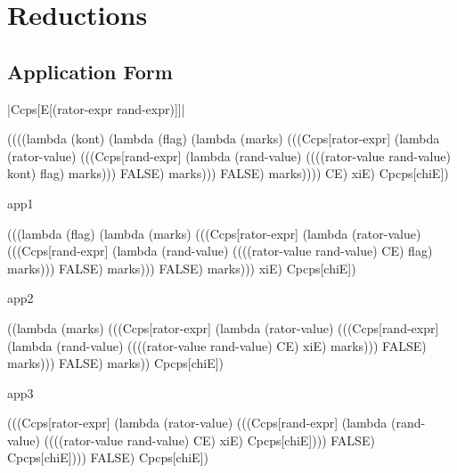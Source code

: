 \chapter{Reductions}

\section{Application Form}

\noindent
\scheme|Ccps[E[(rator-expr rand-expr)]]|
\begin{schemeblock}
\begin{schemedisplay}
((((lambda (kont)
     (lambda (flag)
       (lambda (marks)
         (((Ccps[rator-expr]
                (lambda (rator-value)
                  (((Ccps[rand-expr]
                         (lambda (rand-value)
                           ((((rator-value rand-value) kont) flag) marks)))
                    FALSE) marks)))
           FALSE) marks))))
   CE) xiE) Cpcps[chiE])
\end{schemedisplay}
\end{schemeblock}

\noindent
app1

\begin{schemeblock}
\begin{schemedisplay}
(((lambda (flag)
    (lambda (marks)
      (((Ccps[rator-expr]
             (lambda (rator-value)
               (((Ccps[rand-expr]
                      (lambda (rand-value)
                        ((((rator-value rand-value) CE) flag) marks)))
                 FALSE) marks)))
        FALSE) marks)))
  xiE) Cpcps[chiE])
\end{schemedisplay}
\end{schemeblock}

\noindent
app2

\begin{schemeblock}
\begin{schemedisplay}
((lambda (marks)
   (((Ccps[rator-expr]
          (lambda (rator-value)
            (((Ccps[rand-expr]
                   (lambda (rand-value)
                     ((((rator-value rand-value) CE) xiE) marks)))
              FALSE) marks)))
     FALSE) marks)) Cpcps[chiE])
\end{schemedisplay}
\end{schemeblock}

\noindent
app3

\begin{schemeblock}
\begin{schemedisplay}
(((Ccps[rator-expr]
       (lambda (rator-value)
         (((Ccps[rand-expr]
                (lambda (rand-value)
                  ((((rator-value rand-value) CE) xiE) Cpcps[chiE])))
           FALSE) Cpcps[chiE])))
  FALSE) Cpcps[chiE])
\end{schemedisplay}
\end{schemeblock}


